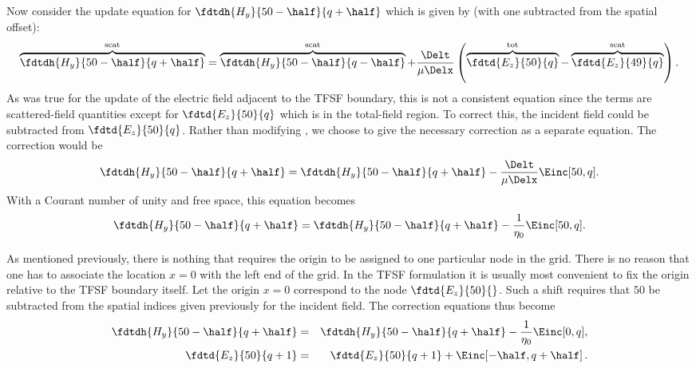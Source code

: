 Now consider the update equation for $\fdtdh{H_y}{50-\half}{q+\half}$
which is given by  (with one subtracted from the
spatial offset):
\begin{equation}
  \overbrace{\fdtdh{H_y}{50-\half}{q+\half}}^{\mbox{\scriptsize scat}} = 
  \overbrace{\fdtdh{H_y}{50-\half}{q-\half}}^{\mbox{\scriptsize scat}} +
  \frac{\Delt}{\mu\Delx}
  \left(
  \overbrace{\fdtd{E_z}{50}{q}}^{\mbox{\scriptsize tot}} - 
  \overbrace{\fdtd{E_z}{49}{q}}^{\mbox{\scriptsize scat}}
  \right).
  \label{eq:updateHyTFSF}
\end{equation}
As was true for the update of the electric field adjacent to the TFSF
boundary, this is not a consistent equation since the terms are
scattered-field quantities except for $\fdtd{E_z}{50}{q}$ which is in
the total-field region.  To correct this, the incident field could be
subtracted from $\fdtd{E_z}{50}{q}$.  Rather than modifying
, we choose to give the necessary correction as
a separate equation.  The correction would be
\begin{equation}
  \fdtdh{H_y}{50-\half}{q+\half} = \fdtdh{H_y}{50-\half}{q+\half} -
  \frac{\Delt}{\mu\Delx} \Einc[50,q].
  \label{eq:correctionHy}
\end{equation}
With a Courant number of unity and free space, this equation becomes
\begin{equation}
  \fdtdh{H_y}{50-\half}{q+\half} = \fdtdh{H_y}{50-\half}{q+\half} -
  \frac{1}{\eta_0} \Einc[50,q].
  \label{eq:correctionHyI}
\end{equation}

As mentioned previously, there is nothing that requires the origin to
be assigned to one particular node in the grid.  There is no reason
that one has to associate the location $x=0$ with the left end of the
grid.  In the TFSF formulation it is usually most convenient to fix
the origin relative to the TFSF boundary itself.  Let the origin $x=0$
correspond to the node $\fdtd{E_z}{50}{}$.  Such a shift requires that
$50$ be subtracted from the spatial indices given previously for the
incident field.  The correction equations thus become
\begin{eqnarray}
  \fdtdh{H_y}{50-\half}{q+\half} &=& \fdtdh{H_y}{50-\half}{q+\half} -
  \frac{1}{\eta_0} \Einc[0,q], 
  \label{eq:correctionHyFinal} 
  \\
  \fdtd{E_z}{50}{q+1} &=& \fdtd{E_z}{50}{q+1} +
  \Einc\!\left[-\half,q+\half\right]. 
  \label{eq:correctionEzFinal} 
\end{eqnarray}


